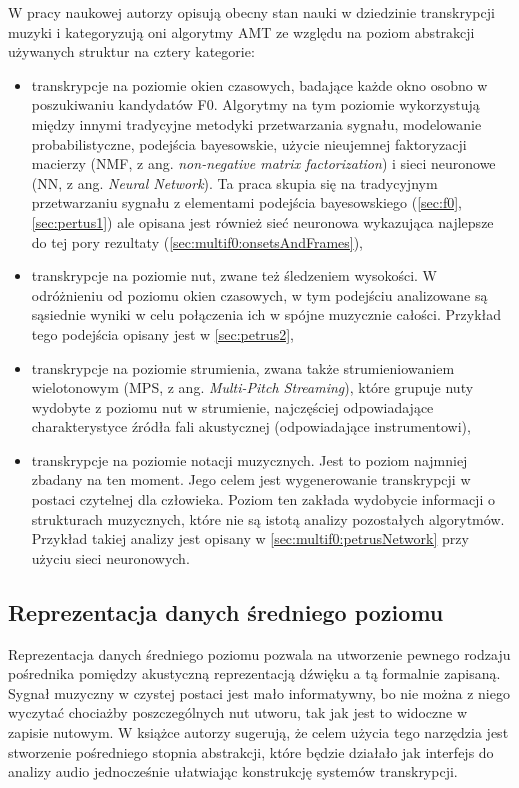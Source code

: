 \documentclass[12pt,a4paper,twoside]{mwart}
\begin{document}
W pracy naukowej 
\cite[22-24]{DBLP:journals/spm/BenetosDDE19}
autorzy opisują obecny stan nauki w dziedzinie transkrypcji muzyki i kategoryzują oni algorytmy AMT ze względu na poziom abstrakcji używanych struktur na cztery kategorie:
\begin{itemize}
  \item transkrypcje na poziomie okien czasowych, badające każde okno osobno w poszukiwaniu kandydatów F0. Algorytmy na tym poziomie wykorzystują między innymi tradycyjne metodyki przetwarzania sygnału, modelowanie probabilistyczne, podejścia bayesowskie, użycie nieujemnej faktoryzacji macierzy (NMF, z ang. \textit{non-negative matrix factorization}) i sieci neuronowe (NN, z ang. \textit{Neural Network}). Ta praca skupia się na tradycyjnym przetwarzaniu sygnału z elementami podejścia bayesowskiego (\ref{sec:f0}, \ref{sec:pertus1}) ale opisana jest również sieć neuronowa wykazująca najlepsze do tej pory rezultaty (\ref{sec:multif0:onsetsAndFrames}),
  \item transkrypcje na poziomie nut, zwane też śledzeniem wysokości. W odróżnieniu od poziomu okien czasowych, w tym podejściu analizowane są sąsiednie wyniki w celu połączenia ich w spójne muzycznie całości. Przykład tego podejścia opisany jest w \ref{sec:petrus2},
  \item transkrypcje na poziomie strumienia, zwana także strumieniowaniem wielotonowym (MPS, z ang. \textit{Multi-Pitch Streaming}), które grupuje nuty wydobyte z poziomu nut w strumienie, najczęściej odpowiadające charakterystyce źródła fali akustycznej (odpowiadające instrumentowi),
  \item transkrypcje na poziomie notacji muzycznych. Jest to poziom najmniej zbadany na ten moment. Jego celem jest wygenerowanie transkrypcji w postaci czytelnej dla człowieka. Poziom ten zakłada wydobycie informacji  o strukturach muzycznych, które nie są istotą analizy pozostałych algorytmów. Przykład takiej analizy jest opisany w \ref{sec:multif0:petrusNetwork} przy użyciu sieci neuronowych.
\end{itemize}


\subsection{Reprezentacja danych średniego poziomu}
Reprezentacja danych średniego poziomu pozwala na utworzenie pewnego rodzaju pośrednika pomiędzy akustyczną reprezentacją dźwięku a tą formalnie zapisaną. Sygnał muzyczny w czystej postaci jest mało informatywny, bo nie można z niego wyczytać chociażby poszczególnych nut utworu, tak jak jest to widoczne w zapisie nutowym. W książce 
\cite[13-17]{Transcription:Anssi:SignalProcessingMethods}
autorzy sugerują, że celem użycia tego narzędzia jest stworzenie pośredniego stopnia abstrakcji, które będzie działało jak interfejs do analizy audio jednocześnie ułatwiając konstrukcję systemów transkrypcji.
\end{document}
